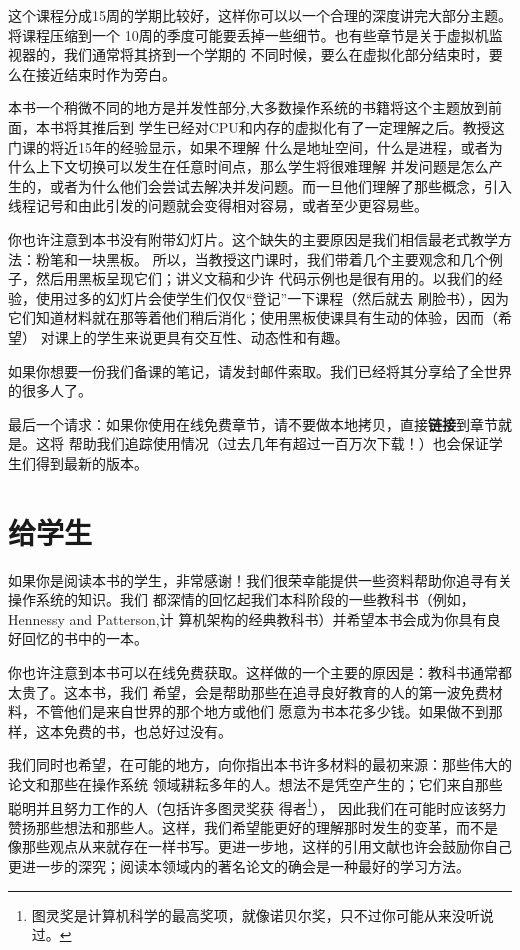 这个课程分成15周的学期比较好，这样你可以以一个合理的深度讲完大部分主题。将课程压缩到一个
10周的季度可能要丢掉一些细节。也有些章节是关于虚拟机监视器的，我们通常将其挤到一个学期的
不同时候，要么在虚拟化部分结束时，要么在接近结束时作为旁白。

本书一个稍微不同的地方是并发性部分,大多数操作系统的书籍将这个主题放到前面，本书将其推后到
学生已经对CPU和内存的虚拟化有了一定理解之后。教授这门课的将近15年的经验显示，如果不理解
什么是地址空间，什么是进程，或者为什么上下文切换可以发生在任意时间点，那么学生将很难理解
并发问题是怎么产生的，或者为什么他们会尝试去解决并发问题。而一旦他们理解了那些概念，引入
线程记号和由此引发的问题就会变得相对容易，或者至少更容易些。

你也许注意到本书没有附带幻灯片。这个缺失的主要原因是我们相信最老式教学方法：粉笔和一块黑板。
所以，当教授这门课时，我们带着几个主要观念和几个例子，然后用黑板呈现它们；讲义文稿和少许
代码示例也是很有用的。以我们的经验，使用过多的幻灯片会使学生们仅仅“登记”一下课程（然后就去
刷脸书），因为它们知道材料就在那等着他们稍后消化；使用黑板使课具有生动的体验，因而（希望）
对课上的学生来说更具有交互性、动态性和有趣。

如果你想要一份我们备课的笔记，请发封邮件索取。我们已经将其分享给了全世界的很多人了。

最后一个请求：如果你使用在线免费章节，请不要做本地拷贝，直接\textbf{链接}到章节就是。这将
帮助我们追踪使用情况（过去几年有超过一百万次下载！）也会保证学生们得到最新的版本。

\clearpage

{}
\section*{给学生}
如果你是阅读本书的学生，非常感谢！我们很荣幸能提供一些资料帮助你追寻有关操作系统的知识。我们
都深情的回忆起我们本科阶段的一些教科书（例如，Hennessy and Patterson,计
算机架构的经典教科书）并希望本书会成为你具有良好回忆的书中的一本。

你也许注意到本书可以在线免费获取。这样做的一个主要的原因是：教科书通常都太贵了。这本书，我们
希望，会是帮助那些在追寻良好教育的人的第一波免费材料，不管他们是来自世界的那个地方或他们
愿意为书本花多少钱。如果做不到那样，这本免费的书，也总好过没有。

我们同时也希望，在可能的地方，向你指出本书许多材料的最初来源：那些伟大的论文和那些在操作系统
领域耕耘多年的人。想法不是凭空产生的；它们来自那些聪明并且努力工作的人（包括许多图灵奖获
得者\footnote{图灵奖是计算机科学的最高奖项，就像诺贝尔奖，只不过你可能从来没听说过。}），
因此我们在可能时应该努力赞扬那些想法和那些人。这样，我们希望能更好的理解那时发生的变革，而不是
像那些观点从来就存在一样书写。更进一步地，这样的引用文献也许会鼓励你自己
更进一步的深究；阅读本领域内的著名论文的确会是一种最好的学习方法。
\clearpage

